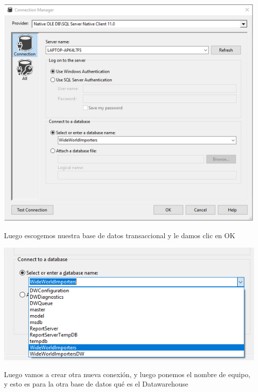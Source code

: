 \documentclass[12pt,letterpaper]{article}
\begin{document}
\begin{center}
\includegraphics[width=17cm]{IMG/29.png} 
\end{center}
Luego escogemos nuestra base de datos transaccional y le damos clic en OK\\
\begin{center}
\includegraphics[width=17cm]{IMG/30.png} 
\end{center}
Luego vamos a crear otra nueva conexi\'on, y luego ponemos el nombre de equipo, y esto es para la otra base de datos qu\'e es el Datawarehouse\\
\end{document}
